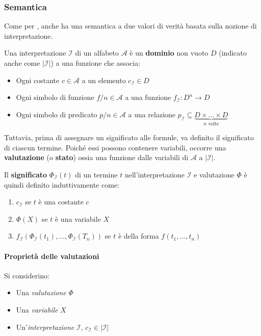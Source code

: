 \documentclass[italian, 10pt]{article}
\begin{document}
\subsubsection{Semantica}

Come per \PL, anche \FOL ha una semantica a due valori di verità basata sulla nozione di interpretazione.

Una interpretazione \(\mathcal{I}\) di un alfabeto \(\mathcal{A}\) è un \textbf{dominio} non vuoto \(D\) (indicato anche come \(|\mathcal{I}|\)) a una funzione che associa:

\begin{itemize}
  \item Ogni costante \(c \in \mathcal{A}\) a un elemento \(c_{\mathcal{I}} \in D\)
  \item Ogni simbolo di funzione \(f/n \in \mathcal{A}\) a una funzione \(f_{\mathcal{I}}: D^n \rightarrow D\)
  \item Ogni simbolo di predicato \(p/n \in \mathcal{A}\) a una relazione \(p_{\mathcal{I}} \subseteq \underbrace{D \times \ldots \times D}_{n \text{ volte}}\)
\end{itemize}

Tuttavia, prima di assegnare un significato alle formule, va definito il significato di ciascun termine.
Poiché essi possono contenere variabili, occorre una \textbf{valutazione} (o \textbf{stato}) ossia una funzione dalle variabili di \(\mathcal{A}\) a \(|\mathcal{I}|\).

Il \textbf{significato} \(\Phi_{\mathcal{I}}(t)\) di un termine \(t\) nell'interpretazione \(\mathcal{I}\) e valutazione \(\Phi\) è quindi definito induttivamente come:

\begin{enumerate}
  \item \(c_{\mathcal{I}}\) se \(t\) è una costante \(c\)
  \item \(\Phi(X)\) se \(t\) è una variabile \(X\)
  \item \(f_{\mathcal{I}} \left( \Phi_{\mathcal{I}}(t_1), \ldots, \Phi_{\mathcal{I}}(T_n) \right)\) se \(t\) è della forma \(f(t_1, \ldots, t_n)\)
\end{enumerate}

\paragraph{Proprietà delle valutazioni}

Si considerino:

\begin{itemize}
  \item Una \textit{valutazione} \(\Phi\)
  \item Una \textit{variabile} \(X\)
  \item Un'\textit{interpretazione} \(\mathcal{I}\), \(c_{\mathcal{I}} \in |\mathcal{I}|\)
\end{itemize}
\end{document}
